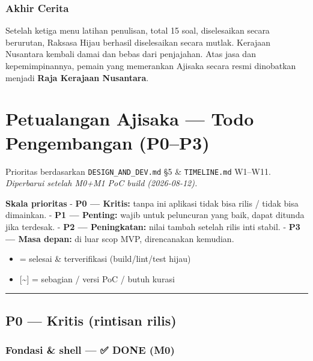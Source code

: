 \documentclass[
  11pt,
]{article}
\providecommand{\tightlist}{%
  \setlength{\itemsep}{0pt}\setlength{\parskip}{0pt}}
\begin{document}
\subsubsection{Akhir Cerita}\label{akhir-cerita}

Setelah ketiga menu latihan penulisan, total 15 soal, diselesaikan
secara berurutan, Raksasa Hijau berhasil diselesaikan secara mutlak.
Kerajaan Nusantara kembali damai dan bebas dari penjajahan. Atas jasa
dan kepemimpinannya, pemain yang memerankan Ajisaka secara resmi
dinobatkan menjadi \textbf{Raja Kerajaan Nusantara}.

\section{Petualangan Ajisaka --- Todo Pengembangan
(P0--P3)}\label{petualangan-ajisaka-todo-pengembangan-p0p3}

Prioritas berdasarkan \texttt{DESIGN\_AND\_DEV.md} §5 \&
\texttt{TIMELINE.md} W1--W11. \emph{Diperbarui setelah M0+M1 PoC build
(2026-08-12).}

\textbf{Skala prioritas} - \textbf{P0 --- Kritis:} tanpa ini aplikasi
tidak bisa rilis / tidak bisa dimainkan. - \textbf{P1 --- Penting:}
wajib untuk peluncuran yang baik, dapat ditunda jika terdesak. -
\textbf{P2 --- Peningkatan:} nilai tambah setelah rilis inti stabil. -
\textbf{P3 --- Masa depan:} di luar scop MVP, direncanakan kemudian.

\begin{itemize}
\tightlist
\item[$\boxtimes$]
  = selesai \& terverifikasi (build/lint/test hijau)
\item
  {[}\textasciitilde{]} = sebagian / versi PoC / butuh kurasi
\end{itemize}

\begin{center}\rule{0.5\linewidth}{0.5pt}\end{center}

\subsection{P0 --- Kritis (rintisan
rilis)}\label{p0-kritis-rintisan-rilis}

\subsubsection{Fondasi \& shell --- ✅ DONE
(M0)}\label{fondasi-shell-done-m0}
\end{document}
